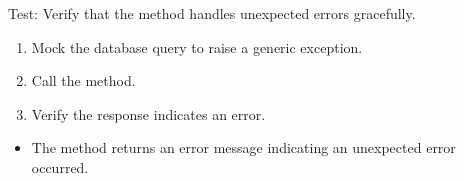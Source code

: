 \documentclass[letterpaper,10pt,english]{sphinxmanual}
\begin{document}
\begin{fulllineitems}
\label{\detokenize{test:test.test_residetnt.test_login_unexpected_error}}
\pysigstartsignatures
\pysiglinewithargsret
{}
{\sphinxparamcomma {}}
{}
\pysigstopsignatures
\sphinxAtStartPar
Test: Verify that the method handles unexpected errors gracefully.
\begin{description}
\begin{enumerate}
%
\item {} 
\sphinxAtStartPar
Mock the database query to raise a generic exception.

\item {} 
\sphinxAtStartPar
Call the  method.

\item {} 
\sphinxAtStartPar
Verify the response indicates an error.

\end{enumerate}

\begin{itemize}
\item {} 
\sphinxAtStartPar
The method returns an error message indicating an unexpected error occurred.

\end{itemize}

\end{description}

\end{fulllineitems}

\end{document}
